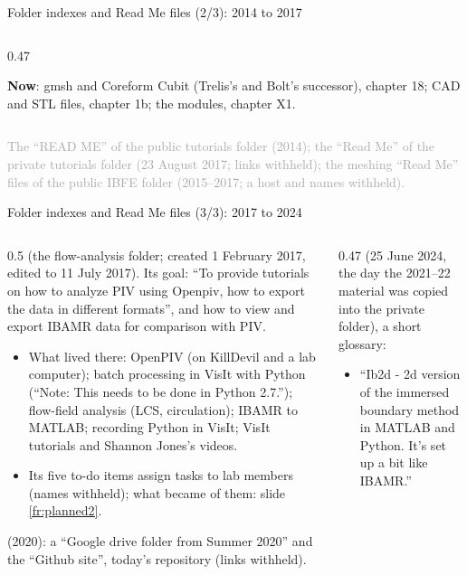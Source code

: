 \documentclass[aspectratio=169,11pt]{beamer}
\newcommand{\sourcecredit}[1]{\vfill\begin{flushright}\tiny\textcolor{DarkGray}{#1}\end{flushright}}
\begin{document}
\begin{frame}{Folder indexes and Read Me files (2/3): 2014 to 2017}
\begin{columns}[T,onlytextwidth]
\begin{column}{0.47\textwidth}
\begin{itemize}
\end{itemize}
\begin{homebox}
\scriptsize \textbf{Now}: gmsh and Coreform Cubit (Trelis's and Bolt's successor), chapter 18; CAD and STL files, chapter 1b; the modules, chapter X1.
\end{homebox}
\end{column}
\end{columns}
\sourcecredit{The ``READ ME'' of the public tutorials folder (2014); the ``Read Me'' of the private tutorials folder (23 August 2017; links withheld); the meshing ``Read Me'' files of the public IBFE folder (2015--2017; a host and names withheld).}
\end{frame}

\begin{frame}{Folder indexes and Read Me files (3/3): 2017 to 2024}
\label{fr:index3}
\begin{columns}[T,onlytextwidth]
\begin{column}{0.5\textwidth}
\scriptsize
{} (the flow-analysis folder; created 1 February 2017, edited to 11 July 2017). Its goal: ``To provide tutorials on how to analyze PIV using Openpiv, how to export the data in different formats'', and how to view and export IBAMR data for comparison with PIV.
\begin{itemize}\setlength{\itemsep}{2pt}
  \item What lived there: OpenPIV (on KillDevil and a lab computer); batch processing in VisIt with Python (``Note: This needs to be done in Python 2.7.''); flow-field analysis (LCS, circulation); IBAMR to MATLAB; recording Python in VisIt; VisIt tutorials and Shannon Jones's videos.
  \item Its five to-do items assign tasks to lab members (names withheld); what became of them: slide \ref{fr:planned2}.
\end{itemize}
\vspace{1mm}
 (2020): a ``Google drive folder from Summer 2020'' and the ``Github site'', today's repository (links withheld).
\end{column}
\begin{column}{0.47\textwidth}
\scriptsize
{} (25 June 2024, the day the 2021--22 material was copied into the private folder), a short glossary:
\begin{itemize}\setlength{\itemsep}{2pt}
  \item ``Ib2d - 2d version of the immersed boundary method in MATLAB and Python. It's set up a bit like IBAMR.''

\end{itemize}
\end{column}
\end{columns}
\end{frame}
\end{document}
